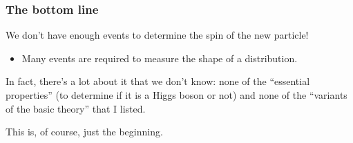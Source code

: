 \documentclass[compress]{beamer}
\newcommand{\isnote}{}
\begin{document}


\begin{frame}
\frametitle{The bottom line}

We don't have enough events to determine the spin of the new particle!
\begin{itemize}
\item Many events are required to measure the shape of a distribution.
\end{itemize}

\vfill
In fact, there's a lot about it that we don't know: none of the ``essential properties'' (to determine if it is a Higgs boson or not) and none of the ``variants of the basic theory'' that I listed.

\vfill
This is, of course, just the beginning.

\label{numpages}
\end{frame}

\setbeamertemplate{headline}{\mbox{ } \hfill
\begin{minipage}{5.5 cm}
\vspace{-0.75 cm} \small
\end{minipage} \hfill
\begin{minipage}{4.5 cm}
\vspace{-0.75 cm} \small
\begin{flushright}
\ifthenelse{\equal{\insertpagenumber}{1}}{}{\hspace{0.2 cm} \insertpagenumber\isnote/\pageref{numpages}}
\end{flushright}
\end{minipage}\mbox{\hspace{0.2 cm}} \hspace{0.01 cm} \vspace{-1.05 cm}}
\end{document}
